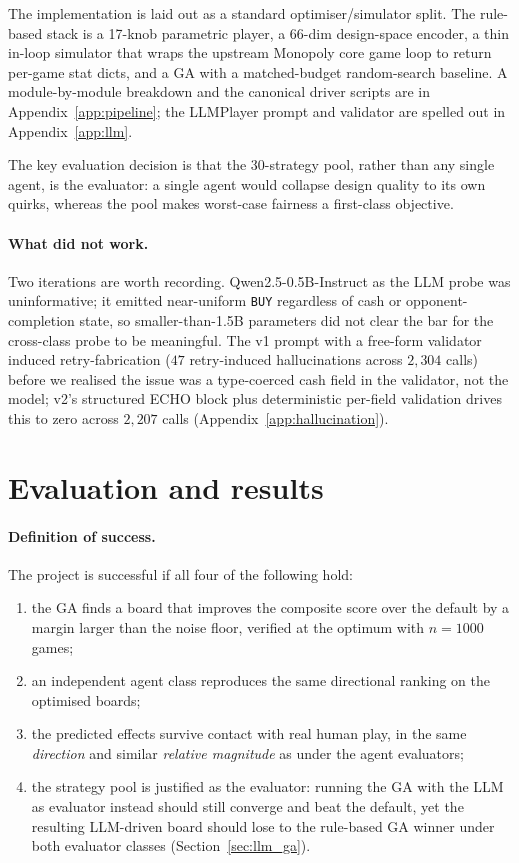 \documentclass[10pt]{article}
\begin{document}
The implementation is laid out as a standard optimiser/simulator
split. The rule-based stack is a 17-knob parametric player, a
66-dim design-space encoder, a thin in-loop simulator that wraps the
upstream Monopoly core game loop to return per-game stat dicts, and a
GA with a matched-budget random-search baseline. A module-by-module
breakdown and the canonical driver scripts are in
Appendix~\ref{app:pipeline}; the LLMPlayer prompt and validator are
spelled out in Appendix~\ref{app:llm}.

The key evaluation decision is that the 30-strategy pool, rather than
any single agent, is the evaluator: a single agent would collapse
design quality to its own quirks, whereas the pool makes worst-case
fairness a first-class objective.

\paragraph{What did not work.} Two iterations are worth recording.
Qwen2.5-0.5B-Instruct as the LLM probe was uninformative; it
emitted near-uniform \texttt{BUY} regardless of cash or
opponent-completion state, so smaller-than-1.5B parameters did not
clear the bar for the cross-class probe to be meaningful. The v1
prompt with a free-form validator induced retry-fabrication ($47$
retry-induced hallucinations across $2{,}304$ calls) before we
realised the issue was a type-coerced cash field in the validator,
not the model; v2's structured ECHO block plus deterministic
per-field validation drives this to zero across $2{,}207$ calls
(Appendix~\ref{app:hallucination}).

\section{Evaluation and results}\label{sec:eval}

\paragraph{Definition of success.} The project is successful if all
four of the following hold:
\begin{enumerate}[leftmargin=1.4em,itemsep=1pt]
\item the GA finds a board that improves the composite score over the
default by a margin larger than the noise floor, verified at the
optimum with $n{=}1000$ games;
\item an independent agent class reproduces the same directional
ranking on the optimised boards;
\item the predicted effects survive contact with real human play, in
the same \emph{direction} and similar \emph{relative magnitude} as
under the agent evaluators;
\item the strategy pool is justified as the evaluator: running the GA
with the LLM as evaluator instead should still converge and beat the
default, yet the resulting LLM-driven board should lose to the
rule-based GA winner under both evaluator classes
(Section~\ref{sec:llm_ga}).
\end{enumerate}
\end{document}
